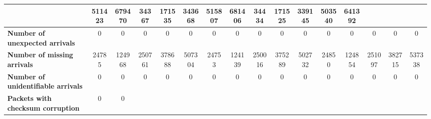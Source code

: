 \begin{table}[!h]
{\begin{tabular}{|l|ccccc|ccccc|ccccc|}
            & \multicolumn{1}{c|}{511423}
            & \multicolumn{1}{c|}{679470}
            & \multicolumn{1}{c|}{34367}
            & \multicolumn{1}{c|}{171535}
            & \multicolumn{1}{c|}{343668}
            & \multicolumn{1}{c|}{515807}
            & \multicolumn{1}{c|}{681406}
            & \multicolumn{1}{c|}{34434}
            & \multicolumn{1}{c|}{171525}
            & \multicolumn{1}{c|}{339145}
            & \multicolumn{1}{c|}{503540}
            & \multicolumn{1}{c|}{641392}
            \\ \hline
            \textbf{Number of unexpected arrivals} & \multicolumn{1}{c|}{0} & \multicolumn{1}{c|}{0}
            & \multicolumn{1}{c|}{0}
            & \multicolumn{1}{c|}{0}
            & \multicolumn{1}{c|}{0}
            & \multicolumn{1}{c|}{0}
            & \multicolumn{1}{c|}{0}
            & \multicolumn{1}{c|}{0}
            & \multicolumn{1}{c|}{0}
            & \multicolumn{1}{c|}{0}
            & \multicolumn{1}{c|}{0}
            & \multicolumn{1}{c|}{0}
            & \multicolumn{1}{c|}{0}
            & \multicolumn{1}{c|}{0}
            & \multicolumn{1}{c|}{0}
            \\ \hline
            \textbf{Number of missing arrivals} & \multicolumn{1}{c|}{24785} & \multicolumn{1}{c|}{124968}
            & \multicolumn{1}{c|}{250761}
            & \multicolumn{1}{c|}{378688}
            & \multicolumn{1}{c|}{507304}
            & \multicolumn{1}{c|}{24753}
            & \multicolumn{1}{c|}{124139}
            & \multicolumn{1}{c|}{250016}
            & \multicolumn{1}{c|}{375289}
            & \multicolumn{1}{c|}{502732}
            & \multicolumn{1}{c|}{24850}
            & \multicolumn{1}{c|}{124854}
            & \multicolumn{1}{c|}{251097}
            & \multicolumn{1}{c|}{382715}
            & \multicolumn{1}{c|}{537338}
            \\ \hline
            \textbf{Number of unidentifiable arrivals} & \multicolumn{1}{c|}{0} & \multicolumn{1}{c|}{0}
            & \multicolumn{1}{c|}{0}
            & \multicolumn{1}{c|}{0}
            & \multicolumn{1}{c|}{0}
            & \multicolumn{1}{c|}{0}
            & \multicolumn{1}{c|}{0}
            & \multicolumn{1}{c|}{0}
            & \multicolumn{1}{c|}{0}
            & \multicolumn{1}{c|}{0}
            & \multicolumn{1}{c|}{0}
            & \multicolumn{1}{c|}{0}
            & \multicolumn{1}{c|}{0}
            & \multicolumn{1}{c|}{0}
            & \multicolumn{1}{c|}{0}
            \\ \hline
            \textbf{Packets with checksum corruption} & \multicolumn{1}{c|}{0} & \multicolumn{1}{c|}{0}

\end{tabular}}
\end{table}
